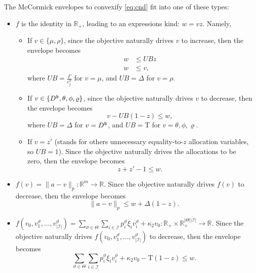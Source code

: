 \documentclass[a4paper,11pt,reqno]{amsart}
\newcommand{\R}{\mathbb{R}}
\newcommand{\I}{\mathcal{I}}
\newcommand{\T}{\mathrm{T}}
\begin{document}
The McCormick envelopes to convexify \eqref{eq:cnd} fit into one of these types:
\begin{itemize}
    \item[--] $f$ is the identity in $\R_+$, leading to an expressions kind: $w=vz$. Namely,
    \begin{itemize}
        \item[$\bullet$] If $v\in\{\mu,\rho\}$, since the objective naturally drives $v$ to increase, then the envelope becomes
        \begin{align*}
            w&\leq UBz\\
            w&\leq v,
        \end{align*}
        where $UB=\frac{\Gamma}{c^\vartheta_j}$ for $v=\mu$, and $UB=\Delta$ for $v=\rho$.
        \item[$\bullet$] If $v\in \{D^{\frak b},\theta,\phi,\varrho\}$, since the objective naturally drives $v$ to decrease, then the envelope becomes
        \begin{equation*}
            v - UB(1-z)  \le w,
        \end{equation*}
        where $UB=\Delta$ for $v=D^{\frak b}$, and $UB=\T$ for $v=\theta,\phi,\varrho$.
        
        \item[$\bullet$] If $v=z'$ (stands for others unnecessary equality-to-$z$ allocation variables, so $UB=1$). Since the objective naturally drives the allocations to be zero, then the envelope becomes
        \begin{equation*}
            z + z' -1 \le w.
        \end{equation*}
    \end{itemize}
    

    \item[--] $f(v)=\|a-v\|_p:\R^m \to \R$. Since the objective naturally drives $f(v)$ to decrease, then the envelope becomes
    \begin{equation*}
        \|a-v\|_p  \le w + \Delta(1-z).
    \end{equation*}

    \item[--] $f(v_0,v^\vartheta_1,\ldots,v^\vartheta_{|\I|})= \sum_{\vartheta\in\Theta} \sum_{i\in\I}p_i^\vartheta\xi_iv^\vartheta_i + \kappa_2v_0 : \R_+\times \R_+^{|\Theta||\I|} \to \R$. Since the objective naturally drives $f(v_0,v^\vartheta_1,\ldots,v^\vartheta_{|\I|})$ to decrease, then the envelope becomes
    \begin{equation*}
        \sum_{\vartheta\in\Theta} \sum_{i\in\I}p_i^\vartheta\xi_iv^\vartheta_i + \kappa_2v_0 - \T(1-z) \le w.
    \end{equation*}
    \end{itemize}
\end{document}
